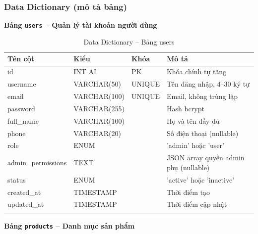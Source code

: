 \documentclass[a4paper]{article}
\begin{document}
\subsubsection{Data Dictionary (mô tả bảng)}

\textbf{Bảng \texttt{users} -- Quản lý tài khoản người dùng}

\begin{longtable}{|p{3cm}|p{2.5cm}|p{1.5cm}|p{6cm}|}
\hline
\textbf{Tên cột} & \textbf{Kiểu} & \textbf{Khóa} & \textbf{Mô tả} \\
\hline
\endhead
id & INT AI & PK & Khóa chính tự tăng \\
\hline
username & VARCHAR(50) & UNIQUE & Tên đăng nhập, 4--30 ký tự \\
\hline
email & VARCHAR(100) & UNIQUE & Email, không trùng lặp \\
\hline
password & VARCHAR(255) & & Hash bcrypt \\
\hline
full\_name & VARCHAR(100) & & Họ và tên đầy đủ \\
\hline
phone & VARCHAR(20) & & Số điện thoại (nullable) \\
\hline
role & ENUM & & 'admin' hoặc 'user' \\
\hline
admin\_permissions & TEXT & & JSON array quyền admin phụ (nullable) \\
\hline
status & ENUM & & 'active' hoặc 'inactive' \\
\hline
created\_at & TIMESTAMP & & Thời điểm tạo \\
\hline
updated\_at & TIMESTAMP & & Thời điểm cập nhật \\
\hline
\caption{Data Dictionary -- Bảng users}
\end{longtable}

\textbf{Bảng \texttt{products} -- Danh mục sản phẩm}
\end{document}
